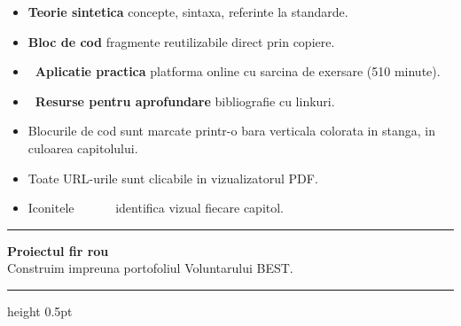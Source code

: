 \documentclass[11pt,a4paper]{article}
\begin{document}
\bigskip

\begin{nota}
\begin{itemize}
  \item \textbf{Teorie sintetica} \textendash{} concepte, sintaxa, referinte la standarde.
  \item \textbf{Bloc de cod} \textendash{} fragmente reutilizabile direct prin copiere.
  \item \textbf{\faGamepad\ Aplicatie practica} \textendash{} platforma online cu sarcina de exersare (5\textendash{}10 minute).
  \item \textbf{\faGraduationCap\ Resurse pentru aprofundare} \textendash{} bibliografie cu linkuri.
\end{itemize}
\end{nota}

\begin{ponturi}
\begin{itemize}
  \item Blocurile de cod sunt marcate printr-o bara verticala colorata in stanga, in culoarea capitolului.
  \item Toate URL-urile sunt clicabile in vizualizatorul PDF.
  \item Iconitele \faCode\ \faPaintBrush\ \faBolt\ \faRocket\ \faShareSquare\ \faChartBar\ identifica vizual fiecare capitol.
\end{itemize}
\end{ponturi}

\clearpage
{}

\noindent\begin{minipage}{0.04\linewidth}\color{themeHtml}\rule{4pt}{2.6em}\end{minipage}%
\begin{minipage}{0.94\linewidth}
  {\sffamily\fontsize{30}{34}\selectfont\textbf{\color{themeText}Proiectul fir rou}}\\[4pt]
  {\sffamily\large\color{black!55}Construim impreuna portofoliul Voluntarului BEST.}
\end{minipage}
\par\vspace{14pt}
{\color{themeHtml!40}\hrule height 0.5pt}
\par\vspace{14pt}
\end{document}
